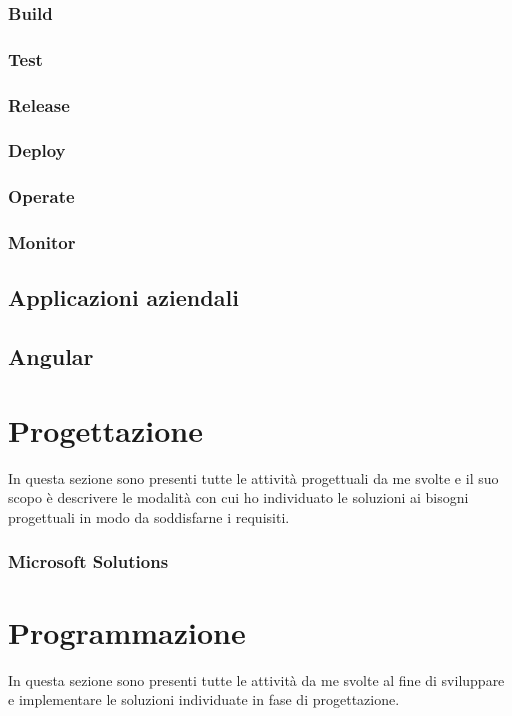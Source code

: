 \subsubsection*{Build}

\subsubsection*{Test}

\subsubsection*{Release}

\subsubsection*{Deploy}

\subsubsection*{Operate}

\subsubsection*{Monitor}

\subsection{Applicazioni aziendali}

\subsection{Angular}

\section{Progettazione}
In questa sezione sono presenti tutte le attività progettuali da me svolte e il suo scopo è descrivere le modalità con cui ho individuato le soluzioni ai bisogni progettuali in modo da soddisfarne i requisiti.
\subsubsection*{Microsoft Solutions}

\section{Programmazione}
In questa sezione sono presenti tutte le attività da me svolte al fine di sviluppare e implementare le soluzioni individuate in fase di progettazione.

